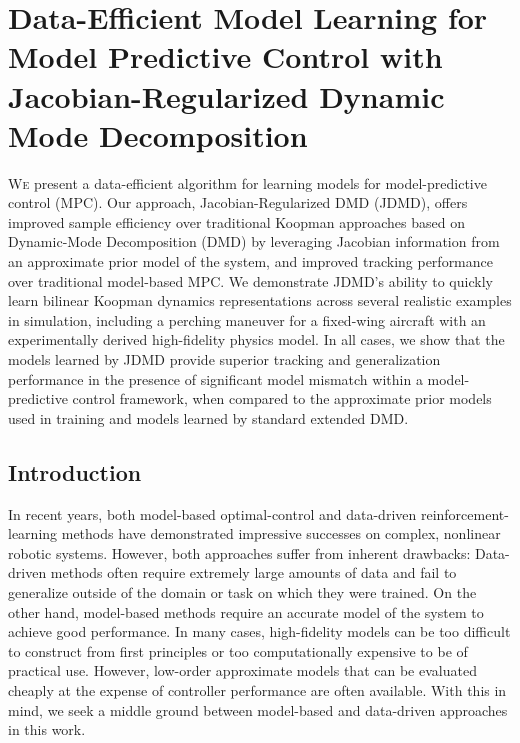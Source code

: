 \documentclass[../root.tex]{subfiles}
\begin{document}
\chapter{
  Data-Efficient Model Learning for Model Predictive Control with
  Jacobian-Regularized Dynamic Mode Decomposition
}

\lettrine{W}e present a data-efficient algorithm for learning models for model-predictive
control (MPC). Our approach, Jacobian-Regularized DMD (JDMD), offers improved
sample efficiency over traditional Koopman approaches based on Dynamic-Mode
Decomposition (DMD) by leveraging Jacobian  information from an approximate
prior model of the system, and improved tracking performance over traditional
model-based MPC. We demonstrate JDMD's ability to quickly learn bilinear
Koopman dynamics representations across several realistic examples in
simulation, including a perching maneuver for a fixed-wing aircraft with an
experimentally derived high-fidelity physics model.   In all cases, we show
that the models learned by JDMD provide superior tracking and generalization
performance in the presence of significant model mismatch within a
model-predictive control framework,  when compared to the approximate prior
models used in training and models learned by  standard extended DMD.

\section{Introduction}

In recent years, both model-based optimal-control
\cite{farshidian_Efficient_2017, kuindersma_Efficiently_2014, bjelonic_WholeBody_2021, subosits_Racetrack_2019}
and data-driven
reinforcement-learning methods \cite{karnchanachari_Practical_2020,li_Reinforcement_2021}
 have
demonstrated impressive successes on complex, nonlinear robotic systems.
However, both approaches suffer from inherent drawbacks: Data-driven methods
often require extremely large amounts of data and fail to generalize outside of
the domain or task on which they were trained. On the other hand, model-based
methods require an accurate model of the system to achieve good performance. In
many cases, high-fidelity models can be too difficult to construct from first
principles or too computationally expensive to be of practical use. However,
low-order approximate models that can be evaluated cheaply at the expense of
controller performance are often available. With this in mind, we seek a middle
ground between model-based and data-driven approaches in this work. 
\end{document}
